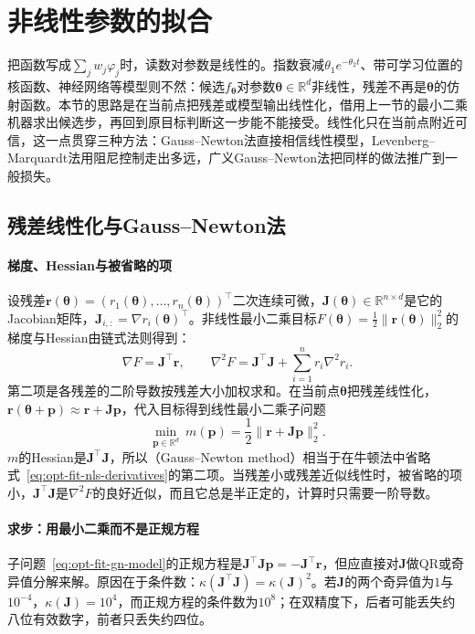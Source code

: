 \section{非线性参数的拟合}
\label{sec:opt-fit-nonlinear}

把函数写成$\sum_jw_j\varphi_j$时，读数对参数是线性的。指数衰减$\theta_1e^{-\theta_2t}$、带可学习位置的核函数、神经网络等模型则不然：候选$f_{\bm\theta}$对参数$\bm\theta\in\mathbb R^d$非线性，残差不再是$\bm\theta$的仿射函数。本节的思路是在当前点把残差或模型输出线性化，借用上一节的最小二乘机器求出候选步，再回到原目标判断这一步能不能接受。线性化只在当前点附近可信，这一点贯穿三种方法：Gauss--Newton法直接相信线性模型，Levenberg--Marquardt法用阻尼控制走出多远，广义Gauss--Newton法把同样的做法推广到一般损失。

\subsection{残差线性化与Gauss--Newton法}
\label{sec:opt-fit-gauss-newton}

\paragraph{梯度、Hessian与被省略的项}
设残差$\bm r(\bm\theta)=(r_1(\bm\theta),\dots,r_n(\bm\theta))^\top$二次连续可微，$\bm J(\bm\theta)\in\mathbb R^{n\times d}$是它的Jacobian矩阵，$\bm J_{i,:}=\nabla r_i(\bm\theta)^\top$。非线性最小二乘目标$F(\bm\theta)=\tfrac12\|\bm r(\bm\theta)\|_2^2$的梯度与Hessian由链式法则得到：
\begin{equation}
  \nabla F=\bm J^\top\bm r,\qquad
  \nabla^2F=\bm J^\top\bm J+\sum_{i=1}^nr_i\nabla^2r_i .
  \label{eq:opt-fit-nls-derivatives}
\end{equation}
第二项是各残差的二阶导数按残差大小加权求和。在当前点$\bm\theta$把残差线性化，$\bm r(\bm\theta+\bm p)\approx\bm r+\bm J\bm p$，代入目标得到线性最小二乘子问题
\begin{equation}
  \min_{\bm p\in\mathbb R^d}\ m(\bm p)=\frac12\|\bm r+\bm J\bm p\|_2^2 .
  \label{eq:opt-fit-gn-model}
\end{equation}
$m$的Hessian是$\bm J^\top\bm J$，所以（Gauss--Newton method）相当于在牛顿法中省略式~\eqref{eq:opt-fit-nls-derivatives}的第二项。当残差小或残差近似线性时，被省略的项小，$\bm J^\top\bm J$是$\nabla^2F$的良好近似，而且它总是半正定的，计算时只需要一阶导数。

\paragraph{求步：用最小二乘而不是正规方程}
子问题~\eqref{eq:opt-fit-gn-model}的正规方程是$\bm J^\top\bm J\bm p=-\bm J^\top\bm r$，但应直接对$\bm J$做QR或奇异值分解来解。原因在于条件数：$\kappa(\bm J^\top\bm J)=\kappa(\bm J)^2$。若$\bm J$的两个奇异值为$1$与$10^{-4}$，$\kappa(\bm J)=10^4$，而正规方程的条件数为$10^8$；在双精度下，后者可能丢失约八位有效数字，前者只丢失约四位。

